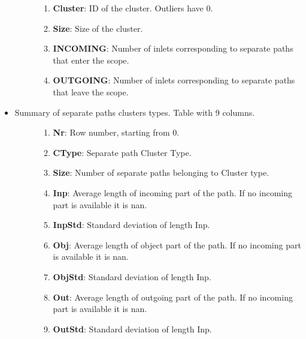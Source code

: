 \documentclass[a4paper,10pt,english]{sphinxmanual}
\begin{document}
\begin{itemize}
\begin{description}
\begin{enumerate}
\item {} 
\textbf{Cluster}: ID of the cluster. Outliers have 0.

\item {} 
\textbf{Size}: Size of the cluster.

\item {} 
\textbf{INCOMING}: Number of inlets corresponding to separate paths that enter the scope.

\item {} 
\textbf{OUTGOING}: Number of inlets corresponding to separate paths that leave the scope.

\end{enumerate}

\end{description}

\item {} \begin{description}
\item[{Summary of separate paths clusters types. Table with 9 columns.}] \leavevmode\begin{enumerate}
\item {} 
\textbf{Nr}: Row number, starting from 0.

\item {} 
\textbf{CType}: Separate path Cluster Type.

\item {} 
\textbf{Size}: Number of separate paths belonging to Cluster type.

\item {} 
\textbf{Inp}: Average length of incoming part of the path. If no incoming part is available it is nan.

\item {} 
\textbf{InpStd}: Standard deviation of length Inp.

\item {} 
\textbf{Obj}: Average length of object part of the path. If no incoming part is available it is nan.

\item {} 
\textbf{ObjStd}: Standard deviation of length Inp.

\item {} 
\textbf{Out}: Average length of outgoing part of the path. If no incoming part is available it is nan.

\item {} 
\textbf{OutStd}: Standard deviation of length Inp.

\end{enumerate}


\end{description}
\end{itemize}
\end{document}
